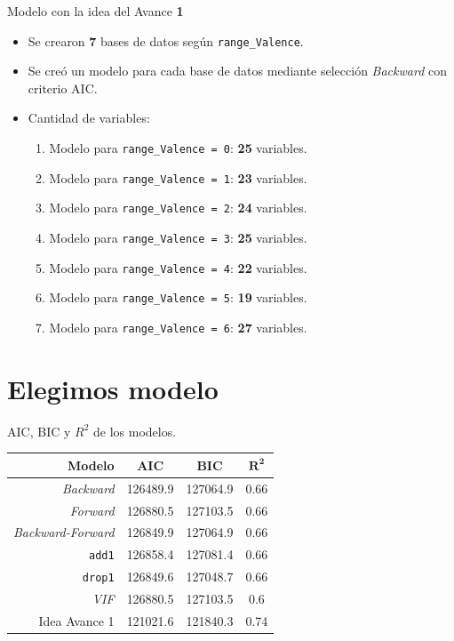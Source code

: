 \documentclass[11pt]{beamer}
\newcommand{\cod}[1]{\texttt{\frenchspacing#1}}
\begin{document}
\begin{frame}{Modelo con la idea del Avance \textbf{1}}
	\begin{itemize}
		\item Se crearon \textbf{7} bases de datos según \cod{range\_Valence}.
		\item Se creó un modelo para cada base de datos mediante selección \textit{Backward} con criterio AIC.
		\item Cantidad de variables:
		\begin{enumerate}
			\item Modelo para \cod{range\_Valence = 0}: \textbf{25} variables.
			\item Modelo para \cod{range\_Valence = 1}: \textbf{23} variables.
			\item Modelo para \cod{range\_Valence = 2}: \textbf{24} variables.
			\item Modelo para \cod{range\_Valence = 3}: \textbf{25} variables.
			\item Modelo para \cod{range\_Valence = 4}: \textbf{22} variables.
			\item Modelo para \cod{range\_Valence = 5}: \textbf{19} variables.
			\item Modelo para \cod{range\_Valence = 6}: \textbf{27} variables.
		\end{enumerate}
	\end{itemize}
\end{frame}

\section{Elegimos modelo}

\begin{frame}{AIC, BIC y $R^2$ de los modelos.}
		\begin{tabular}{| r | c | c | c |}
			\hline
			\textbf{Modelo} & \textbf{AIC} & \textbf{BIC} & $\mathbf{R^2}$
			\\ \hline
			\textit{Backward} & 126489.9 &  127064.9 & 0.66 \\
			\textit{Forward} & 126880.5 & 127103.5 & 0.66 \\
			\textit{Backward-Forward} & 126849.9 & 127064.9 & 0.66\\
			\cod{add1} & 126858.4 &  127081.4& 0.66\\
			\cod{drop1} & 126849.6 & 127048.7 & 0.66\\
			\textit{VIF} & 126880.5 & 127103.5 & 0.6 \\ 
			Idea Avance 1 & 121021.6 & 121840.3 & 0.74
			\\ \hline
		\end{tabular}
\end{frame}
\end{document}

